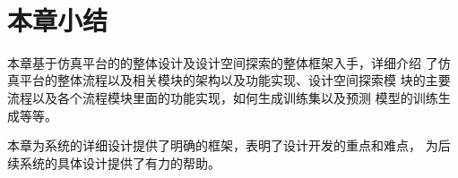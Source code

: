 ~\\
\section{本章小结}
本章基于仿真平台的的整体设计及设计空间探索的整体框架入手，详细介绍
了仿真平台的整体流程以及相关模块的架构以及功能实现、设计空间探索模
块的主要流程以及各个流程模块里面的功能实现，如何生成训练集以及预测
模型的训练生成等等。

本章为系统的详细设计提供了明确的框架，表明了设计开发的重点和难点，
为后续系统的具体设计提供了有力的帮助。